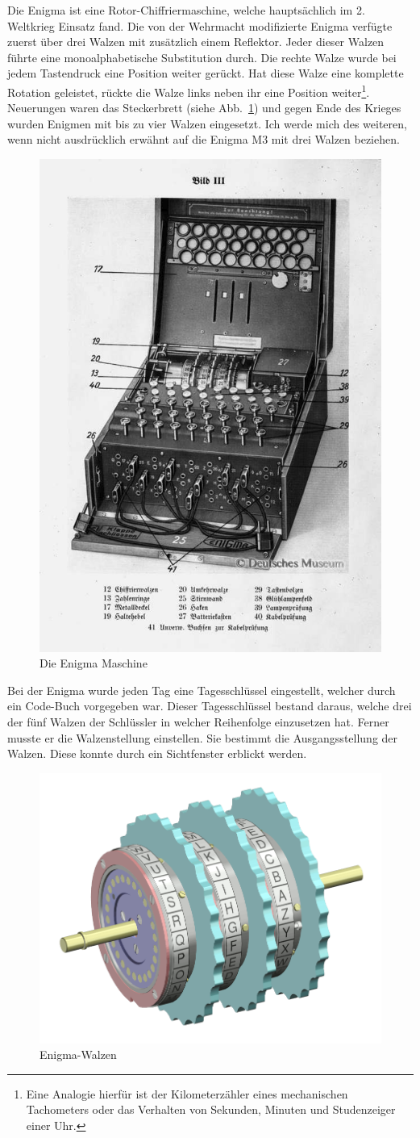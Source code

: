 \documentclass[ngerman, a4paper, footsepline, headsepline, numbers=noenddot]{scrreport}
\begin{document}
	Die Enigma ist eine Rotor-Chiffriermaschine, welche hauptsächlich im 2. Weltkrieg Einsatz fand. Die von der Wehrmacht modifizierte Enigma verfügte zuerst über drei Walzen mit zusätzlich einem Reflektor. Jeder dieser Walzen führte eine monoalphabetische Substitution durch. Die rechte Walze wurde bei jedem Tastendruck eine Position weiter gerückt. Hat diese Walze eine komplette Rotation geleistet, rückte die Walze links neben ihr eine Position weiter\footnote{Eine Analogie hierfür ist der Kilometerzähler eines mechanischen Tachometers oder das Verhalten von Sekunden, Minuten und Studenzeiger einer Uhr.}. Neuerungen waren das Steckerbrett (siehe Abb.~\ref{fig:enigma_complete}) und gegen Ende des Krieges wurden Enigmen mit bis zu vier Walzen eingesetzt. Ich werde mich des weiteren, wenn nicht ausdrücklich erwähnt auf die Enigma M3 mit drei Walzen beziehen.
	\nopagebreak
	\begin{figure}[htbp]
		\centering
		\includegraphics[width=.5\linewidth]{Enigma-komplett.png}
		\caption{Die Enigma Maschine}
		\label{fig:enigma_complete}
	\end{figure}
	
	\newpage
	
	 Bei der Enigma wurde jeden Tag  eine Tagesschlüssel eingestellt, welcher durch ein Code-Buch vorgegeben war. Dieser Tagesschlüssel bestand daraus, welche drei der fünf Walzen der Schlüssler in welcher Reihenfolge einzusetzen hat. Ferner musste er die Walzenstellung einstellen. Sie bestimmt die Ausgangsstellung der Walzen. Diese konnte durch ein Sichtfenster erblickt werden.
	
	\begin{figure}[htbp]
		\centering
		\includegraphics[width=.4\linewidth]{Enigma-rotor-set.png}
		\caption{Enigma-Walzen}
		\label{fig:enigma_rotors}
	\end{figure}
	
\end{document}
